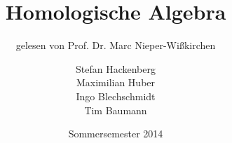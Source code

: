 \documentclass[%
halfparskip*,       %
titlepage,            %
bibtotoc,           %
DIV = 15,
headsepline,
openany,
BCOR=0.8cm,
pointlessnumbers,        %
chapterprefix=true
]
{scrbook}
\theoremstyle{plain}
\theoremstyle{plain}
\theoremstyle{plain}
\theoremstyle{nonumberplain}
\numberwithin{equation}{chapter}
\newcommand{\?}{{\huge \color{red} ?}}
\begin{document}

\frontmatter




\subject{Vorlesungszusammenfassung}
\title{Homologische Algebra}
\subtitle{gelesen von Prof. Dr. Marc Nieper-Wißkirchen}
\author{
Stefan Hackenberg\\
Maximilian Huber\\
Ingo Blechschmidt\\
Tim Baumann
}
\date{Sommersemester 2014}  %


\maketitle             %



\cleardoubleemptypage

\setcounter{tocdepth}{4}
\tableofcontents


%
\mainmatter






%
%
%
%
%
%

\nocite{*}
\printbibliography


\end{document}
